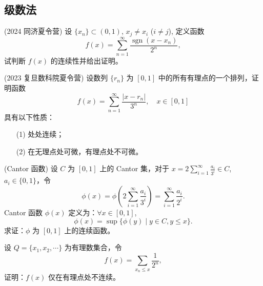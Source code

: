 \documentclass[lang=cn,10pt,thmcnt=section]{elegantbook}
\begin{document}
\subsection{级数法}
\begin{example}
	(2024 同济夏令营) 设 \(\{x_n\} \subset (0,1)\), \(x_j \neq x_i\) (\(i \neq j\)), 定义函数
\[ f(x) = \sum_{n=1}^{\infty} \frac{\operatorname{sgn}(x - x_n)}{2^n}, \]
试判断 \(f(x)\) 的连续性并给出证明。

\end{example}
\begin{example}
	(2023 复旦数科院夏令营) 设数列 \(\{r_n\}\) 为 \([0,1]\) 中的所有有理点的一个排列，证明函数
\[ f(x) = \sum_{n=1}^{\infty} \frac{|x - r_n|}{3^n}, \quad x \in [0,1] \]
具有以下性质：
\begin{enumerate}
    \item[(1)] 处处连续；
    \item[(2)] 在无理点处可微，有理点处不可微。
\end{enumerate}
\end{example}
\begin{example}
	(Cantor 函数) 设 \( C \) 为 \([0,1]\) 上的 Cantor 集，对于 \( x = 2 \sum_{i=1}^{\infty} \frac{a_i}{3^i} \in C \), \( a_i \in \{0,1\} \)，令  
\[ \phi(x) = \phi\left(2 \sum_{i=1}^{\infty} \frac{a_i}{3^i}\right) = \sum_{i=1}^{\infty} \frac{a_i}{2^i}. \]  
Cantor 函数 \(\phi(x)\) 定义为：\(\forall x \in [0,1]\),  
\[ \phi(x) = \sup\{\phi(y) \mid y \in C, y \leq x\}. \]  
求证：\(\phi\) 为 \([0,1]\) 上的连续函数。
\end{example}
\begin{example}
	设 \( Q = \{x_1, x_2, \cdots\} \) 为有理数集合，令  
	\[ f(x) = \sum_{x_n \leq x} \frac{1}{2^n}, \]  
	证明：\( f(x) \) 仅在有理点处不连续。
\end{example}
\end{document}
